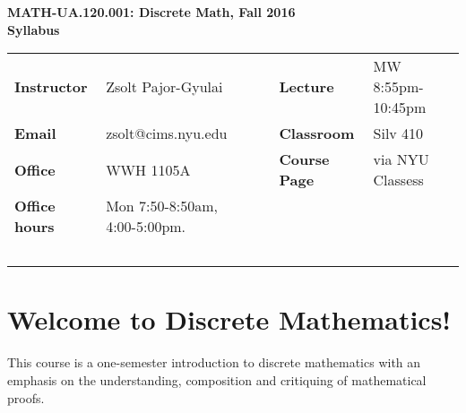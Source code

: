 \documentclass[10pt]{article}
\theoremstyle{definition}
\begin{document}
%
\thispagestyle{empty}
\begin{center}
\textbf{\Large
MATH-UA.120.001: Discrete Math, Fall 2016 \\
Syllabus}
\end{center}

\vspace{0.25cm}

\noindent
\begin{tabular}{l l p{2.4cm} l l}
\textbf{Instructor} & Zsolt Pajor-Gyulai 	& & \textbf{Lecture} & MW 8:55pm-10:45pm\\
\textbf{Email} & zsolt@cims.nyu.edu 	& & \textbf{Classroom} & Silv 410\\
\textbf{Office} & WWH 1105A		& & \textbf{Course Page} & via NYU Classess\\
\textbf{Office hours} & Mon 7:50-8:50am, 4:00-5:00pm. & & & \\ 
							 ~ \\

\end{tabular}




\noindent

\section*{Welcome to Discrete Mathematics!}
This course is a one-semester introduction to discrete mathematics with an
emphasis on the understanding, composition and critiquing of mathematical proofs.
\vspace{0.2cm}

\end{document}

